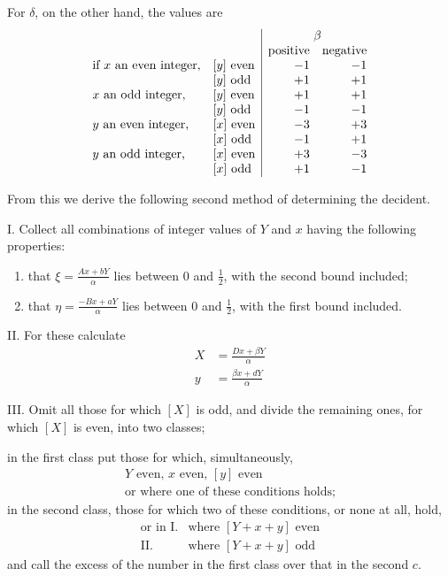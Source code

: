 For $\delta$, on the other hand, the values are
\[
\begin{array}{ll|rr}
&&\multicolumn{2}{c}{\beta}\\
&&\text{positive}&\text{negative}\\
\text{if }x\text{ an even integer,}&[y]\text{ even}&-1&-1\\
&[y]\text{ odd}&+1&+1\\
x\text{ an odd integer,}&[y]\text{ even}&+1&+1\\
&[y]\text{ odd}&-1&-1\\
y\text{ an even integer,}&[x]\text{ even}&-3&+3\\
&[x]\text{ odd}&-1&+1\\
y\text{ an odd integer,}&[x]\text{ even}&+3&-3\\
&[x]\text{ odd}&+1&-1
\end{array}
\]

\clearpage{}
From this we derive the following second method of determining the decident.

I. Collect all combinations of integer values of $Y$ and $x$ having the following properties:
\begin{enumerate}
\item that $\xi=\frac{Ax+bY}{\alpha}$ lies between $0$ and $\frac12$, with the second bound included;
\item that $\eta=\frac{-Bx+aY}{\alpha}$ lies between $0$ and $\frac12$, with the first bound included.
\end{enumerate}

II. For these calculate
\[
\begin{aligned}
X&=\frac{Dx+\beta Y}{\alpha}\\[3pt]
y&=\frac{\beta x+dY}{\alpha}
\end{aligned}
\]

III. Omit all those for which $[X]$ is odd, and divide the remaining ones, for which $[X]$ is even, into two classes;

in the first class put those for which, simultaneously,
\[
\begin{array}{l}
Y\text{ even, }x\text{ even, }[y]\text{ even}\\
\text{or where one of these conditions holds;}
\end{array}
\]
in the second class, those for which two of these conditions, or none at all, hold,
\[
\begin{array}{rl}
\text{or in I.}&\text{where }[Y+x+y]\text{ even}\\
\text{II.}&\text{where }[Y+x+y]\text{ odd}
\end{array}
\]
and call the excess of the number in the first class over that in the second $c$.

